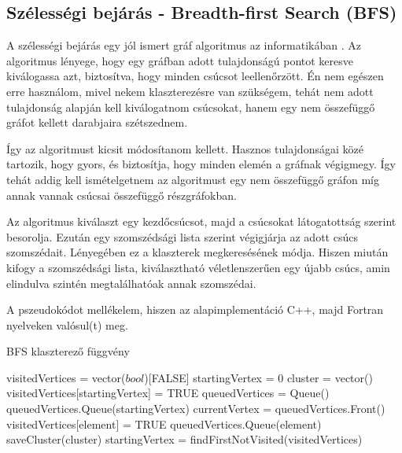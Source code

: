 \documentclass[a4paper,12pt]{article}
\begin{document}
\vspace{5mm}

\subsection{ Szélességi bejárás - Breadth-first Search (BFS)}

\par A szélességi bejárás egy jól ismert gráf algoritmus az informatikában \cite{bfs}. Az algoritmus lényege, hogy egy gráfban adott tulajdonságú pontot keresve kiválogassa azt, biztosítva, hogy minden csúcsot leellenőrzött. Én nem egészen erre használom, mivel nekem klaszterezésre van szükségem, tehát nem adott tulajdonság alapján kell kiválogatnom csúcsokat, hanem egy nem összefüggő gráfot kellett darabjaira szétszednem.

\vspace{5mm}

\par Így az algoritmust kicsit módosítanom kellett. Hasznos tulajdonságai közé tartozik, hogy gyors, és biztosítja, hogy minden elemén a gráfnak végigmegy. Így tehát addig kell ismételgetnem az algoritmust egy nem összefüggő gráfon míg annak vannak csúcsai összefüggő részgráfokban. 

\vspace{5mm}

\par Az algoritmus kiválaszt egy kezdőcsúcsot, majd a csúcsokat látogatottság szerint besorolja. Ezután egy szomszédsági lista szerint végigjárja az adott csúcs szomszédait. Lényegében ez a klaszterek megkeresésének módja. Hiszen miután kifogy a szomszédsági lista, kiválasztható véletlenszerűen egy újabb csúcs, amin elindulva szintén megtalálhatóak annak szomszédai. 

\vspace{5mm}

\par A pszeudokódot mellékelem, hiszen az alapimplementáció C++, majd Fortran nyelveken valósul(t) meg.

\vspace{5mm}

\begin{center}
\begin{algorithm}
\caption{BFS klaszterező függvény}
\begin{algorithmic}
\STATE visitedVertices = vector($bool$)[FALSE]
\STATE startingVertex = 0
	\STATE cluster = vector()
	\STATE visitedVertices[startingVertex] = TRUE
	\STATE queuedVertices = Queue()
	\STATE queuedVertices.Queue(startingVertex)
		\STATE currentVertex = queuedVertices.Front()
				\STATE visitedVertices[element] = TRUE
				\STATE queuedVertices.Queue(element)
			\ENDIF
		\ENDFOR
	\STATE saveCluster(cluster)
	\STATE startingVertex = findFirstNotVisited(visitedVertices)
	\ENDWHILE
\ENDWHILE
\end{algorithmic}
\end{algorithm}
\end{center}
\end{document}
